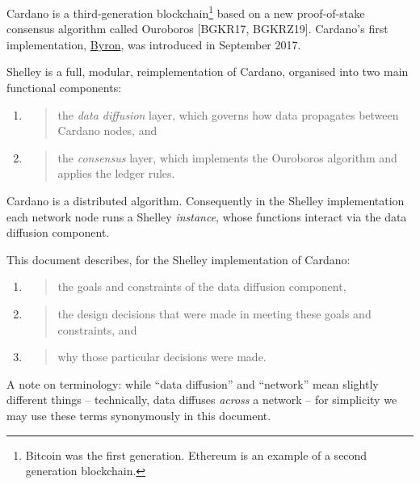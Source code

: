 \documentclass[]{article}
\begin{document}
Cardano is a third-generation blockchain\footnote{Bitcoin was the first
  generation. Ethereum is an example of a second generation blockchain.}
based on a new proof-of-stake consensus algorithm called Ouroboros
{[}BGKR17, BGKRZ19{]}. Cardano's first implementation,
\href{https://cardanoroadmap.com/en/byron/}{{Byron}}, was introduced in
September 2017.

Shelley is a full, modular, reimplementation of Cardano, organised into
two main functional components:

\begin{enumerate}
\def\labelenumi{\arabic{enumi}.}
\item
  \begin{quote}
  the \emph{data diffusion} layer, which governs how data propagates
  between Cardano nodes, and
  \end{quote}
\item
  \begin{quote}
  the \emph{consensus} layer, which implements the Ouroboros algorithm
  and applies the ledger rules.
  \end{quote}
\end{enumerate}

Cardano is a distributed algorithm. Consequently in the Shelley
implementation each network node runs a Shelley \emph{instance}, whose
functions interact via the data diffusion component.

This document describes, for the Shelley implementation of Cardano:

\begin{enumerate}
\def\labelenumi{\arabic{enumi}.}
\item
  \begin{quote}
  the goals and constraints of the data diffusion component,
  \end{quote}
\item
  \begin{quote}
  the design decisions that were made in meeting these goals and
  constraints, and
  \end{quote}
\item
  \begin{quote}
  why those particular decisions were made.
  \end{quote}
\end{enumerate}

A note on terminology: while ``data diffusion'' and ``network'' mean
slightly different things -- technically, data diffuses \emph{across} a
network -- for simplicity we may use these terms synonymously in this
document.
\end{document}
